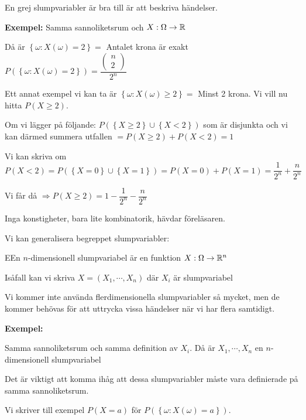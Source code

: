 \par\bigskip
\noindent En grej slumpvariabler är bra till är att beskriva händelser.
\par\bigskip
\noindent\textbf{Exempel:} Samma sannoliketsrum och $X:\Omega\to\mathbb{R}$\par
\noindent Då är $\left\{\omega:X(\omega)=2\right\}=$ Antalet krona är exakt $P(\left\{\omega:X(\omega)=2\right\})=\dfrac{\begin{pmatrix}n\\2\end{pmatrix}}{2^n}$
\par\bigskip
\noindent Ett annat exempel vi kan ta är $\left\{\omega:X(\omega)\geq2\right\} = $ Minst 2 krona. Vi vill nu hitta $P(X\geq2)$.\par
\noindent Om vi lägger på följande: $P(\left\{X\geq2\right\}\cup\left\{X<2\right\})$ som är disjunkta och vi kan därmed summera utfallen $ = P(X\geq2)+P(X<2) = 1$\par
\noindent Vi kan skriva om $P(X<2) = P(\left\{X=0\right\}\cup\left\{X=1\right\}) = P(X=0)+P(X=1) = \dfrac{1}{2^n}+\dfrac{n}{2^n}$\par
\noindent Vi får då $\Rightarrow P(X\geq2) = 1-\dfrac{1}{2^n}-\dfrac{n}{2^n}$
\par\bigskip
\noindent Inga konstigheter, bara lite kombinatorik, hävdar föreläsaren.
\par\bigskip
\noindent Vi kan generalisera begreppet slumpvariabler:
\par\bigskip
\begin{theo}
  EEn $n$-dimensionell slumpvariabel är en funktion $X:\Omega\to\mathbb{R}^n$
\end{theo}
\par\bigskip
\noindent Isåfall kan vi skriva $X = (X_1,\cdots,X_n)$ där $X_i$ är slumpvariabel\par
\noindent Vi kommer inte använda flerdimensionella slumpvariabler så mycket, men de kommer behövas för att uttrycka vissa händelser när vi har flera samtidigt.
\par\bigskip
\noindent\textbf{Exempel:}\par
\noindent Samma sannoliketsrum och samma definition av $X_i$. Då är $X_1,\cdots, X_n$ en $n$-dimensionell slumpvariabel
\par\bigskip
\noindent Det är viktigt att komma ihåg att dessa slumpvariabler måste vara definierade på samma sannoliketsrum.
\par\bigskip
\noindent Vi skriver till exempel $P(X=a)$ för $P(\left\{\omega:X(\omega)=a\right\})$.
